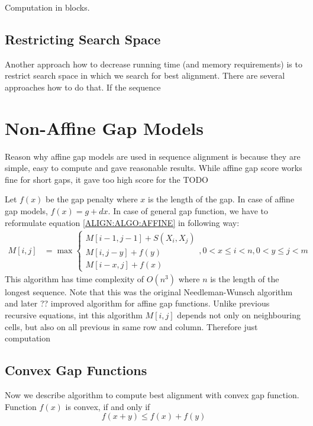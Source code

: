 Computation in blocks. 

\subsection{Restricting Search Space}

Another approach how to decrease running time (and memory requirements) is to 
restrict search space in which we search for best alignment.
There are several approaches how to do that. If the sequence 


\section{Non-Affine Gap Models} 

Reason why affine gap models are used in sequence alignment is because they are
simple, easy to compute and gave reasonable results. While affine gap score
works fine for short gaps, it gave too high score for the TODO

Let $f(x)$ be the gap penalty where $x$ is the length of the gap. In case of
affine gap models, $f(x)=g+dx$. In case of general gap function, we have to
reformulate equation \ref{ALIGN:ALGO:AFFINE} in following way:
\begin{align}
M[i,j] &= \max
\begin{cases}
 M[i-1,j-1]+S(X_i,X_j)\\
 M[i,j-y]+f(y)\\
 M[i-x,j]+f(x)
\end{cases}, 0<x\leq i<n,0<y\leq j<m
\end{align}
This algorithm has time complexity of $O(n^3)$ where $n$ is the length of the
longest sequence. Note that this was the original Needleman-Wunsch\cite{}
algorithm and later ?? improved algorithm for affine gap functions\cite{}.
Unlike previous recursive equations, int this algorithm $M[i,j]$ depends not
only on neighbouring cells, but also on all previous in same row and column.
Therefore just computation 

\subsection{Convex Gap Functions}

Now we describe algorithm to compute best alignment with convex gap function.
Function $f(x)$ is convex, if and only if
\[f(x+y)\leq f(x)+f(y)\]
 



